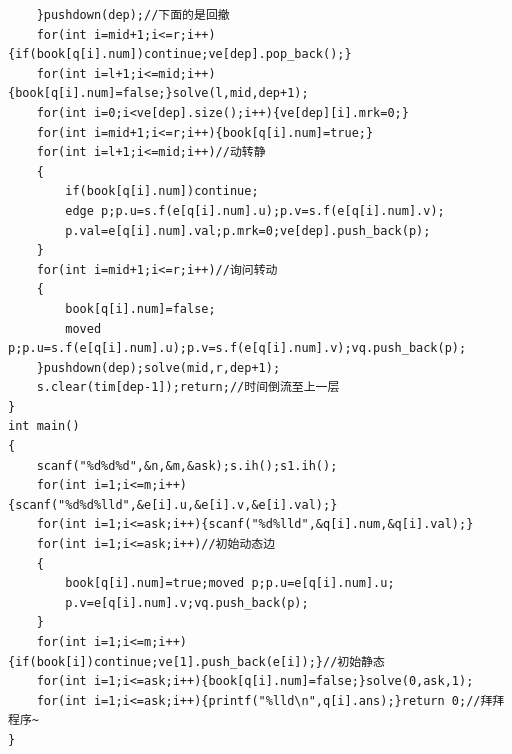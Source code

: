\begin{verbatim}
    }pushdown(dep);//下面的是回撤
    for(int i=mid+1;i<=r;i++){if(book[q[i].num])continue;ve[dep].pop_back();}
    for(int i=l+1;i<=mid;i++){book[q[i].num]=false;}solve(l,mid,dep+1);
    for(int i=0;i<ve[dep].size();i++){ve[dep][i].mrk=0;}
    for(int i=mid+1;i<=r;i++){book[q[i].num]=true;}
    for(int i=l+1;i<=mid;i++)//动转静
    {
        if(book[q[i].num])continue;
        edge p;p.u=s.f(e[q[i].num].u);p.v=s.f(e[q[i].num].v);
        p.val=e[q[i].num].val;p.mrk=0;ve[dep].push_back(p);
    }
    for(int i=mid+1;i<=r;i++)//询问转动
    {
        book[q[i].num]=false;
        moved p;p.u=s.f(e[q[i].num].u);p.v=s.f(e[q[i].num].v);vq.push_back(p);
    }pushdown(dep);solve(mid,r,dep+1);
    s.clear(tim[dep-1]);return;//时间倒流至上一层
}
int main()
{
    scanf("%d%d%d",&n,&m,&ask);s.ih();s1.ih();
    for(int i=1;i<=m;i++){scanf("%d%d%lld",&e[i].u,&e[i].v,&e[i].val);}
    for(int i=1;i<=ask;i++){scanf("%d%lld",&q[i].num,&q[i].val);}
    for(int i=1;i<=ask;i++)//初始动态边
    {
        book[q[i].num]=true;moved p;p.u=e[q[i].num].u;
        p.v=e[q[i].num].v;vq.push_back(p);
    }
    for(int i=1;i<=m;i++){if(book[i])continue;ve[1].push_back(e[i]);}//初始静态
    for(int i=1;i<=ask;i++){book[q[i].num]=false;}solve(0,ask,1);
    for(int i=1;i<=ask;i++){printf("%lld\n",q[i].ans);}return 0;//拜拜程序~
}
\end{verbatim}
